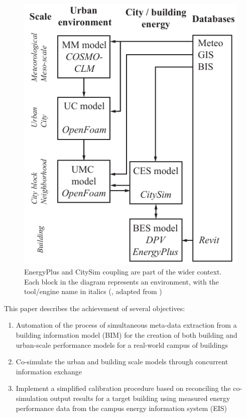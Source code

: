 \documentclass{tBPS2e}
\theoremstyle{plain}
\theoremstyle{definition}
\theoremstyle{remark}
\begin{document}
\begin{figure}[H]
\centering
\includegraphics[scale=0.7]{figures/UMEM_overview_new}
\caption{EnergyPlus and CitySim coupling are part of the wider context. Each
block in the diagram represents an environment, with the tool/engine name in
italics (\citep{thomas2014multiscale}, adapted from \citep{Dorer:2013vt})}
\label{fig:UMEM}
\end{figure}

This paper describes the achievement of several objectives:
\begin{enumerate}
  \item Automation of the process of simultaneous meta-data extraction from a
  building information model (BIM) for the creation of both building and
  urban-scale performance models for a real-world campus of buildings
  \item Co-simulate the urban and building scale models through concurrent information exchange
  \item Implement a simplified calibration procedure based on reconciling the
  co-simulation output results for a target building using measured energy
  performance data from the campus energy information system (EIS)
\end{enumerate}
\end{document}
